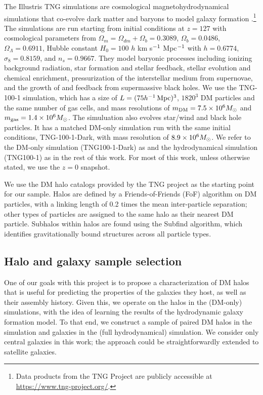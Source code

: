 The Illustris TNG simulations are cosmological magnetohydrodynamical simulations that co-evolve dark matter and baryons to model galaxy formation \citep{springel_first_2018,nelson_first_2018,pillepich_first_2018,naiman_first_2018,marinacci_first_2018}.\footnote{Data products from the TNG Project are publicly accessible at \url{https://www.tng-project.org/}.}
The simulations are run starting from initial conditions at $z=127$ with cosmological parameters from \cite{ade_planck_2016} $\Omega_m = \Omega_{dm} + \Omega_b = 0.3089$, $\Omega_b = 0.0486$, $\Omega_\Lambda = 0.6911$, Hubble constant $H_0 = 100$ $h$ km s$^{-1}$ Mpc$^{-1}$ with $h = 0.6774$, $\sigma_8 = 0.8159$, and $n_s = 0.9667$.
They model baryonic processes including ionizing background radiation, star formation and stellar feedback, stellar evolution and chemical enrichment, pressurization of the interstellar medium from supernovae, and the growth of and feedback from supermassive black holes.   
We use the TNG-100-1 simulation, which has a size of $L = (75 h^{-1}\,\mathrm{Mpc})^3$, $1820^3$ DM particles and the same number of gas cells, and mass resolutions of $m_\text{DM} = 7.5 \times 10^6 M_\mathrm{\odot}$ and $m_\text{gas} = 1.4 \times 10^6 M_\mathrm{\odot}$.
The simuluation also evolves star/wind and black hole particles.
It has a matched DM-only simulation run with the same initial conditions, TNG-100-1-Dark, with mass resolution of $8.9 \times 10^6 M_\mathrm{\odot}$.
We refer to the DM-only simulation (TNG100-1-Dark) as \dark and the hydrodynamical simulation (TNG100-1) as \hydro in the rest of this work.
For most of this work, unless otherwise stated, we use the $z=0$ snapshot.

We use the DM halo catalogs provided by the TNG project as the starting point for our sample.
Halos are defined by a Friends-of-Friends (FoF) algorithm on DM particles, with a linking length of 0.2 times the mean inter-particle separation; other types of particles are assigned to the same halo as their nearest DM particle.
Subhalos within halos are found using the Subfind algorithm, which identifies gravitationally bound structures across all particle types.


\subsection{Halo and galaxy sample selection}
\label{sec:select}

One of our goals with this project is to propose a characterization of DM halos that is useful for predicting the properties of the galaxies they host, as well as their assembly history.
Given this, we operate on the halos in the \dark (DM-only) simulations, with the idea of learning the results of the hydrodynamic galaxy formation model.
To that end, we construct a sample of paired DM halos in the \dark simulation and galaxies in the \hydro (full hydrodynamical) simulation. 
We consider only central galaxies in this work; the approach could be straightforwardly extended to satellite galaxies.

